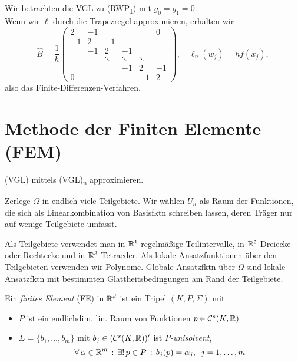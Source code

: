 \documentclass{cheat-sheet}
\newcommand{\Cont}{\mathcal{C}} %
\newcommand{\tss}[1]{\textsubscript{#1}} %
\begin{document}
\begin{bem}
\begin{enumerate}
    Wir betrachten die VGL zu (RWP\tss{1}) mit $g_0 = g_1 = 0$. \\
    Wenn wir $\ell$ durch die Trapezregel approximieren, erhalten wir
    \[
      \hat{B} = \frac{1}{h} \begin{pmatrix}
        2 & -1 & &&& 0 \\
        -1 & 2 & -1 &&& \\
        & -1 & 2 & -1 && \\
        && \ddots & \ddots & \ddots \\
        &&& -1 & 2 & -1 \\
        0 &&&& -1 & 2
      \end{pmatrix}, \quad
      \ell_n(w_j) = h f(x_j),
    \]
    also das Finite-Differenzen-Verfahren.
  \end{enumerate}
\end{bem}

\section{Methode der Finiten Elemente (FEM)}

\begin{ziel}
  (VGL) mittels (VGL)\tss{n} approximieren.
\end{ziel}

\begin{idee}
  Zerlege $\Omega$ in endlich viele Teilgebiete.
  Wir wählen $U_n$ als Raum der Funktionen, die sich als Linearkombination von Basisfktn schreiben lassen, deren Träger nur auf wenige Teilgebiete umfasst.
\end{idee}

\begin{bem}
  Als Teilgebiete verwendet man
  in $\mathbb{R}^1$ regelmäßige Teilintervalle, 
  in $\mathbb{R}^2$ Dreiecke oder Rechtecke und
  in $\mathbb{R}^3$ Tetraeder.
  Als lokale Ansatzfunktionen über den Teilgebieten verwenden wir Polynome.
  Globale Ansatzfktn über $\Omega$ sind lokale Ansatzfktn mit bestimmten Glattheitsbedingungen am Rand der Teilgebiete.
\end{bem}

\begin{defn}
  Ein \emph{finites Element} (FE) in $\mathbb{R}^d$ ist ein Tripel $(K, P, \Sigma)$ mit
  \begin{itemize}
    \item $P$ ist ein endlichdim. lin. Raum von Funktionen $p \in \Cont^s(K, \R)$
    \item $\Sigma = \{ b_1, \ldots, b_m \}$ mit $b_j \in (\Cont^s(K, \R))'$ ist \emph{$P$-unisolvent}, \dh{}
    \[
      \forall \, {\alpha \in \mathbb{R}^m} \,:\, \exists! \, {p \in P} \,:\, b_j(p) = \alpha_j, \enspace j = 1, \ldots, m
    \]
  \end{itemize}
\end{defn}
\end{document}
